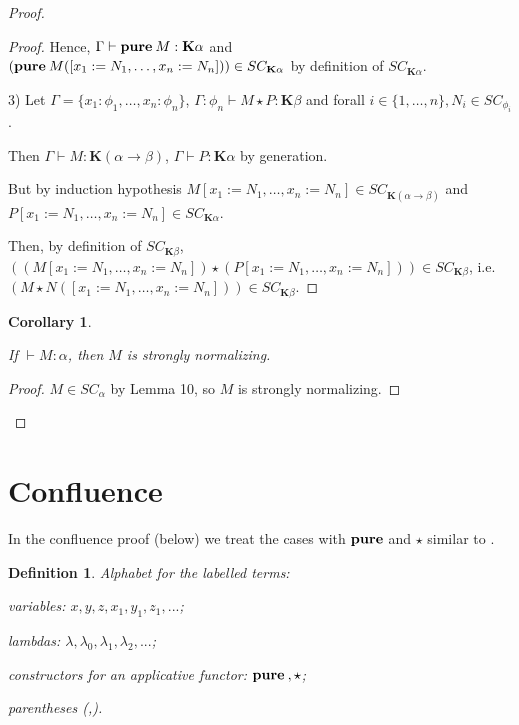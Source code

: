 \documentclass[a4paper]{article}
\newtheorem{defin}{Definition}
\newtheorem{col}{Corollary}
\begin{document}
\begin{proof}
\begin{proof}
  Hence, $\Gamma \vdash {\bf pure \: } M : \textbf{K}\alpha$ and $({\bf pure \: } M ([x_1 := N_1, \dots, x_n := N_n])) \in SC_{\textbf{K}\alpha}$ by definition of $SC_{\textbf{K}\alpha}$.

  3) Let $\Gamma = \{ x_1 : \phi_1, \dots, x_n : \phi_n \}$, $\Gamma : \phi_n \vdash M \star P : \textbf{K}\beta$ and forall $i \in \{ 1, \dots, n\}, N_i \in SC_{\phi_i}$.

  Then $\Gamma \vdash M : \textbf{K}(\alpha \to \beta)$, $\Gamma \vdash P : \textbf{K}\alpha$ by generation.

  But by induction hypothesis $M [x_1 := N_1, \dots, x_n := N_n] \in SC_{\textbf{K}(\alpha \to
  \beta)}$ and $P [x_1 := N_1, \dots, x_n := N_n] \in SC_{\textbf{K}\alpha}$.

  Then, by definition of $SC_{\textbf{K}\beta}$, $((M [x_1 := N_1, \dots, x_n := N_n]) \star (P [x_1 := N_1, \dots, x_n := N_n])) \in SC_{\textbf{K}\beta}$, i.e. $(M \star N ([x_1 := N_1, \dots, x_n := N_n])) \in
  SC_{\textbf{K}\beta}$.
  \end{proof}

  \begin{col}

  $ $

  If $\vdash M : \alpha$, then $M$ is strongly normalizing.

  \end{col}

  \begin{proof}

  $M \in SC_{\alpha}$ by Lemma 10, so $M$ is strongly normalizing.

  \end{proof}


  \end{proof}

\section{Confluence}

In the confluence proof (below) we treat the cases with ${\bf pure}$ and $\star$ similar to \cite{Baren} \cite{Baren2}.

\begin{defin} Alphabet for the labelled terms:

variables: $x, y, z, x_1, y_1, z_1, ...$;

lambdas: $\lambda, \lambda_0, \lambda_1, \lambda_2, ...$;

constructors for an applicative functor: ${\bf pure \: }, \star$;

parentheses (,).

\end{defin}
\end{document}
